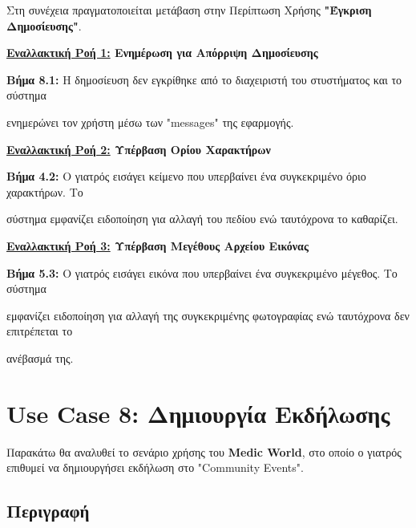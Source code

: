 \documentclass{article}
\begin{document}
Στη συνέχεια πραγματοποιείται μετάβαση στην Περίπτωση Χρήσης \textbf{"Έγκριση Δημοσίευσης"}.\vspace{0.2cm}

\textbf{\underline{Εναλλακτική Ροή 1:} Ενημέρωση για Απόρριψη Δημοσίευσης} \vspace{0.2cm}
\par \textbf{Βήμα 8.1:} Η δημοσίευση δεν εγκρίθηκε από το διαχειριστή του στυστήματος και το σύστημα \par ενημερώνει τον χρήστη μέσω των "messages" της εφαρμογής. \vspace{0.2cm}

\textbf{\underline{Εναλλακτική Ροή 2:} Υπέρβαση Ορίου Χαρακτήρων} \vspace{0.2cm}
\par \textbf{Βήμα 4.2:} Ο γιατρός εισάγει κείμενο που υπερβαίνει ένα συγκεκριμένο όριο χαρακτήρων. Το \par σύστημα εμφανίζει ειδοποίηση για αλλαγή του πεδίου ενώ ταυτόχρονα το καθαρίζει. \vspace{0.2cm}

\textbf{\underline{Εναλλακτική Ροή 3:} Υπέρβαση Μεγέθους Αρχείου Εικόνας} \vspace{0.2cm}
\par \textbf{Βήμα 5.3:} Ο γιατρός εισάγει εικόνα που υπερβαίνει ένα συγκεκριμένο μέγεθος. Το σύστημα \par εμφανίζει ειδοποίηση για αλλαγή της συγκεκριμένης φωτογραφίας ενώ ταυτόχρονα δεν επιτρέπεται το \par ανέβασμά της. \vspace{0.2cm}

\section{Use Case 8: Δημιουργία Εκδήλωσης}

Παρακάτω θα αναλυθεί το σενάριο χρήσης του \textbf{Medic World}, στο οποίο ο γιατρός επιθυμεί να δημιουργήσει εκδήλωση στο "Community Events".

\subsection{Περιγραφή}
\end{document}
